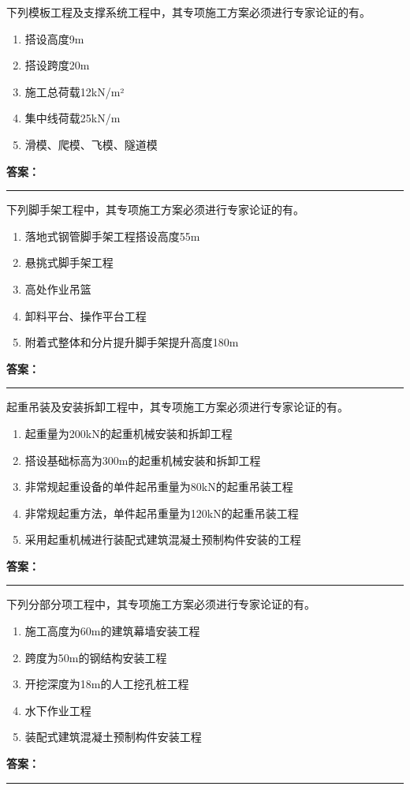 \documentclass[UTF8,fontset=fandol,11pt]{ctexart}
\newcommand{\answerline}{\textcolor{answerred}{\rule{2.4cm}{0.7pt}}}
\begin{document}
\begin{quizbox}[title={第 4 题}]
下列模板工程及支撑系统工程中，其专项施工方案必须进行专家论证的有。\\
\begin{enumerate}[label=\Alph*.]
\item 搭设高度9m
\item 搭设跨度20m
\item 施工总荷载12kN/m²
\item 集中线荷载25kN/m
\item 滑模、爬模、飞模、隧道模
\end{enumerate}
\textbf{\textcolor{answerred}{答案：}} \answerline
\end{quizbox}

\begin{quizbox}[title={第 5 题}]
下列脚手架工程中，其专项施工方案必须进行专家论证的有。\\
\begin{enumerate}[label=\Alph*.]
\item 落地式钢管脚手架工程搭设高度55m
\item 悬挑式脚手架工程
\item 高处作业吊篮
\item 卸料平台、操作平台工程
\item 附着式整体和分片提升脚手架提升高度180m
\end{enumerate}
\textbf{\textcolor{answerred}{答案：}} \answerline
\end{quizbox}

\begin{quizbox}[title={第 6 题}]
起重吊装及安装拆卸工程中，其专项施工方案必须进行专家论证的有。\\
\begin{enumerate}[label=\Alph*.]
\item 起重量为200kN的起重机械安装和拆卸工程
\item 搭设基础标高为300m的起重机械安装和拆卸工程
\item 非常规起重设备的单件起吊重量为80kN的起重吊装工程
\item 非常规起重方法，单件起吊重量为120kN的起重吊装工程
\item 采用起重机械进行装配式建筑混凝土预制构件安装的工程
\end{enumerate}
\textbf{\textcolor{answerred}{答案：}} \answerline
\end{quizbox}

\begin{quizbox}[title={第 7 题}]
下列分部分项工程中，其专项施工方案必须进行专家论证的有。\\
\begin{enumerate}[label=\Alph*.]
\item 施工高度为60m的建筑幕墙安装工程
\item 跨度为50m的钢结构安装工程
\item 开挖深度为18m的人工挖孔桩工程
\item 水下作业工程
\item 装配式建筑混凝土预制构件安装工程
\end{enumerate}
\textbf{\textcolor{answerred}{答案：}} \answerline
\end{quizbox}
\end{document}

